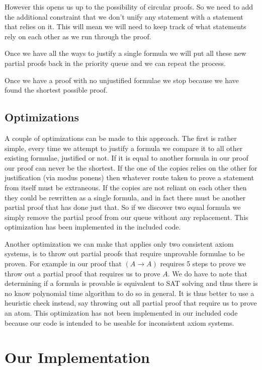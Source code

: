\documentclass{article}
\begin{document}
However this opens us up to the possibility of circular proofs.
So we need to add the additional constraint that we don't unify any statement with a statement that relies on it.
This will mean we will need to keep track of what statements rely on each other as we run through the proof.

Once we have all the ways to justify a single formula we will put all these new partial proofs back in the priority queue and we can repeat the process.

Once we have a proof with no unjustified formulae we stop because we have found the shortest possible proof.

\subsection{Optimizations}

A couple of optimizations can be made to this approach.
The first is rather simple, every time we attempt to justify a formula we compare it to all other existing formulae, justified or not.
If it is equal to another formula in our proof our proof can never be the shortest.
If the one of the copies relies on the other for justification (via modus ponens) then whatever route taken to prove a statement from itself must be extraneous.
If the copies are not reliant on each other then they could be rewritten as a single formula, and in fact there must be another partial proof that has done just that.
So if we discover two equal formula we simply remove the partial proof from our queue without any replacement.
This optimization has been implemented in the included code.

Another optimization we can make that applies only two consistent axiom systems, is to throw out partial proofs that require unprovable formulae to be proven.
For example in our proof that $(A\rightarrow A)$ requires 5 steps to prove we throw out a partial proof that requires us to prove $A$.
We do have to note that determining if a formula is provable is equivalent to SAT solving and thus there is no know polynomial time algorithm to do so in general.
It is thus better to use a heuristic check instead, say throwing out all partial proof that require us to prove an atom.
This optimization has not been implemented in our included code because our code is intended to be useable for inconsistent axiom systems.

\section{Our Implementation}
\end{document}
